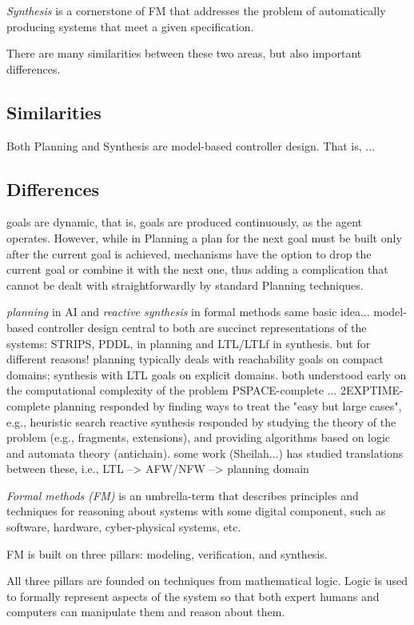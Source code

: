 \documentclass[10pt,a4paper,sans]{moderncv}
\begin{document}
\emph{Synthesis} is a cornerstone of FM that addresses the problem of automatically producing systems that 
meet a given specification. 

There are many similarities between these two areas, but also important differences.

\subsection{Similarities}
Both Planning and Synthesis are model-based controller design. That is, ...


\subsection{Differences}


goals are dynamic, that is, goals are produced continuously,
as the agent operates. However, while in Planning a plan for the next goal must be built only after
the current goal is achieved, mechanisms have the option to drop the current goal or combine it with
the next one, thus adding a complication that cannot be dealt with straightforwardly by standard
Planning techniques.

\emph{planning} in AI and \emph{reactive synthesis} in formal methods 
\en
\- same basic idea... model-based controller design
\- central to both are succinct representations of the systems: STRIPS, PDDL, in planning and LTL/LTLf in synthesis.
but for different reasons! planning typically deals with reachability goals on compact domains; synthesis with LTL goals on explicit domains.
\- both understood early on the computational complexity of the problem PSPACE-complete ... 2EXPTIME-complete
\- planning responded by finding ways to treat the "easy but large cases", e.g., heuristic search
\- reactive synthesis responded by studying the theory of the problem (e.g., fragments, extensions), and providing algorithms based on logic and automata theory (antichain).
\- some work (Sheilah...) has studied translations between these, i.e., LTL --> AFW/NFW --> planning domain
\ne





\emph{Formal methods (FM)} is an umbrella-term that describes principles and techniques for reasoning 
about systems with some digital component, such as software, hardware, cyber-physical systems, etc.
\begin{framed}
\noindent FM is built on three pillars: modeling, verification, and synthesis.  
\end{framed}
All three pillars are founded 
on techniques from mathematical logic. Logic is used to formally represent aspects of the system so that both expert humans and computers can 
manipulate them and reason about them.
\end{document}
